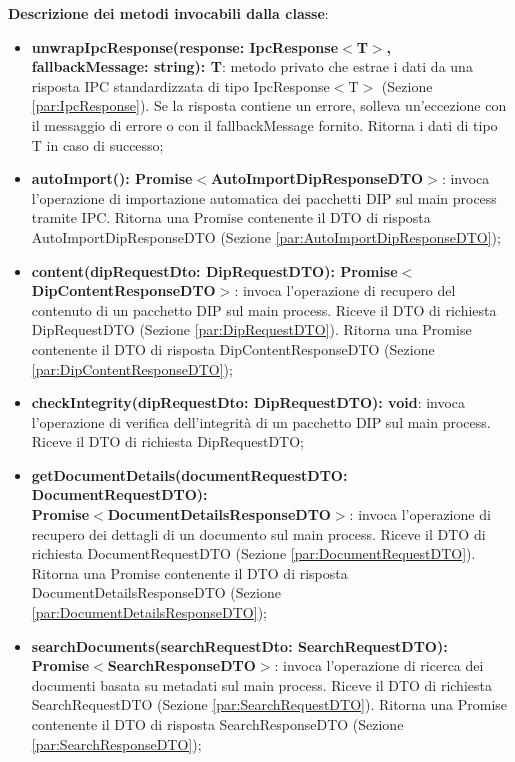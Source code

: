 \documentclass[a4paper,12pt]{article}
\begin{document}
{{{{                \noindent \textbf{Descrizione dei metodi invocabili dalla classe}:
                \begin{itemize}
                    \item \textbf{unwrapIpcResponse(response: IpcResponse$<$T$>$, fallbackMessage: string): T}: metodo privato che estrae i dati da una risposta IPC standardizzata di tipo IpcResponse$<$T$>$ (Sezione \ref{par:IpcResponse}). Se la risposta contiene un errore, solleva un'eccezione con il messaggio di errore o con il fallbackMessage fornito. Ritorna i dati di tipo T in caso di successo;
                    \item \textbf{autoImport(): Promise$<$AutoImportDipResponseDTO$>$}: invoca l'operazione di importazione automatica dei pacchetti DIP sul main process tramite IPC. Ritorna una Promise contenente il DTO di risposta AutoImportDipResponseDTO (Sezione \ref{par:AutoImportDipResponseDTO});
                    \item \textbf{content(dipRequestDto: DipRequestDTO): Promise$<$DipContentResponseDTO$>$}: invoca l'operazione di recupero del contenuto di un pacchetto DIP sul main process. Riceve il DTO di richiesta DipRequestDTO (Sezione \ref{par:DipRequestDTO}). Ritorna una Promise contenente il DTO di risposta DipContentResponseDTO (Sezione \ref{par:DipContentResponseDTO});
                    \item \textbf{checkIntegrity(dipRequestDto: DipRequestDTO): void}: invoca l'operazione di verifica dell'integrità di un pacchetto DIP sul main process. Riceve il DTO di richiesta DipRequestDTO;
                    \item \textbf{getDocumentDetails(documentRequestDTO: DocumentRequestDTO):\\ Promise$<$DocumentDetailsResponseDTO$>$}: invoca l'operazione di recupero dei dettagli di un documento sul main process. Riceve il DTO di richiesta DocumentRequestDTO (Sezione \ref{par:DocumentRequestDTO}). Ritorna una Promise contenente il DTO di risposta DocumentDetailsResponseDTO (Sezione \ref{par:DocumentDetailsResponseDTO});
                    \item \textbf{searchDocuments(searchRequestDto: SearchRequestDTO):\\ Promise$<$SearchResponseDTO$>$}: invoca l'operazione di ricerca dei documenti basata su metadati sul main process. Riceve il DTO di richiesta SearchRequestDTO (Sezione \ref{par:SearchRequestDTO}). Ritorna una Promise contenente il DTO di risposta SearchResponseDTO (Sezione \ref{par:SearchResponseDTO});

\end{itemize}}}}}
\end{document}
